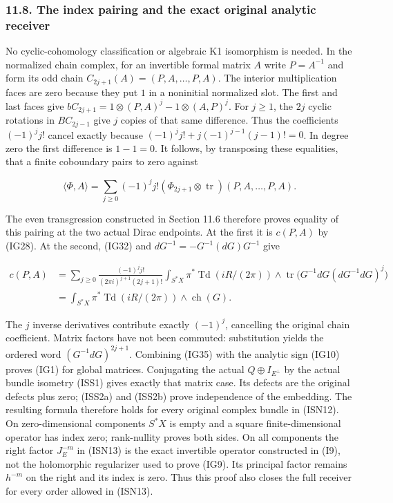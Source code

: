 \documentclass[
  11pt,
]{article}
\begin{document}
\subsubsection{11.8. The index pairing and the exact original analytic
receiver}\label{the-index-pairing-and-the-exact-original-analytic-receiver}

No cyclic-cohomology classification or algebraic K1 isomorphism is
needed. In the normalized chain complex, for an invertible formal matrix
\(A\) write \(P=A^{-1}\) and form its odd chain
\(C_{2j+1}(A)=(P,A,\ldots,P,A)\). The interior multiplication faces are
zero because they put \(1\) in a noninitial normalized slot. The first
and last faces give \(bC_{2j+1}=1\otimes(P,A)^j-1\otimes(A,P)^j\). For
\(j\geq1\), the \(2j\) cyclic rotations in \(BC_{2j-1}\) give \(j\)
copies of that same difference. Thus the coefficients \((-1)^jj!\)
cancel exactly because \((-1)^jj!+j(-1)^{j-1}(j-1)!=0\). In degree zero
the first difference is \(1-1=0\). It follows, by transposing these
equalities, that a finite coboundary pairs to zero against

\[
 \langle\Phi,A\rangle=
    \sum_{j\geq0}(-1)^jj!
       (\Phi_{2j+1}\otimes\operatorname{tr})(P,A,\ldots,P,A).
\tag{IG34}
\]

The even transgression constructed in Section 11.6 therefore proves
equality of this pairing at the two actual Dirac endpoints. At the first
it is \(c(P,A)\) by (IG28). At the second, (IG32) and
\(dG^{-1}=-G^{-1}(dG)G^{-1}\) give

\[
 \begin{split}
 c(P,A)
 &=\sum_{j\geq0}\frac{(-1)^jj!}{(2\pi i)^{j+1}(2j+1)!}
      \int_{S^*X}\pi^*\operatorname{Td}(iR/(2\pi))\wedge
       \operatorname{tr}\big(G^{-1}dG(dG^{-1}dG)^j\big)\\
 &=\int_{S^*X}\pi^*\operatorname{Td}(iR/(2\pi))
                     \wedge\operatorname{ch}(G).
 \end{split}
\tag{IG35}
\]

The \(j\) inverse derivatives contribute exactly \((-1)^j\), cancelling
the original chain coefficient. Matrix factors have not been commuted:
substitution yields the ordered word \((G^{-1}dG)^{2j+1}\). Combining
(IG35) with the analytic sign (IG10) proves (IG1) for global matrices.
Conjugating the actual \(Q\oplus I_{E^\perp}\) by the actual bundle
isometry (ISS1) gives exactly that matrix case. Its defects are the
original defects plus zero; (ISS2a) and (ISS2b) prove independence of
the embedding. The resulting formula therefore holds for every original
complex bundle in (ISN12). On zero-dimensional components \(S^*X\) is
empty and a square finite-dimensional operator has index zero;
rank-nullity proves both sides. On all components the right factor
\(J_E^{-m}\) in (ISN13) is the exact invertible operator constructed in
(I9), not the holomorphic regularizer used to prove (IG9). Its principal
factor remains \(h^{-m}\) on the right and its index is zero. Thus this
proof also closes the full receiver for every order allowed in (ISN13).
\end{document}
